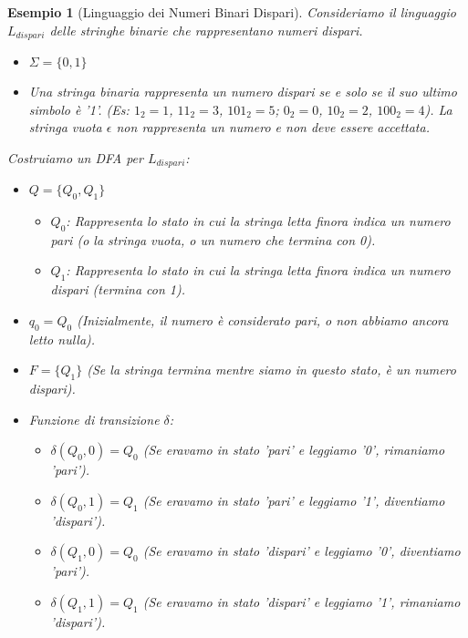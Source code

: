 \documentclass[a4paper]{article}
\newtheorem{example}{Esempio}
\begin{document}
\begin{example}[Linguaggio dei Numeri Binari Dispari]
Consideriamo il linguaggio $L_{dispari}$ delle stringhe binarie che rappresentano numeri dispari.
\begin{itemize}
    \item $\Sigma = \{0, 1\}$
    \item Una stringa binaria rappresenta un numero dispari se e solo se il suo ultimo simbolo è '1'. (Es: $1_2=1$, $11_2=3$, $101_2=5$; $0_2=0$, $10_2=2$, $100_2=4$). La stringa vuota $\epsilon$ non rappresenta un numero e non deve essere accettata.
\end{itemize}

Costruiamo un DFA per $L_{dispari}$:
\begin{itemize}
    \item $Q = \{Q_0, Q_1\}$
        \begin{itemize}
            \item $Q_0$: Rappresenta lo stato in cui la stringa letta finora indica un numero pari (o la stringa vuota, o un numero che termina con 0).
            \item $Q_1$: Rappresenta lo stato in cui la stringa letta finora indica un numero dispari (termina con 1).
        \end{itemize}
    \item $q_0 = Q_0$ (Inizialmente, il numero è considerato pari, o non abbiamo ancora letto nulla).
    \item $F = \{Q_1\}$ (Se la stringa termina mentre siamo in questo stato, è un numero dispari).
    \item Funzione di transizione $\delta$:
        \begin{itemize}
            \item $\delta(Q_0, 0) = Q_0$ (Se eravamo in stato 'pari' e leggiamo '0', rimaniamo 'pari').
            \item $\delta(Q_0, 1) = Q_1$ (Se eravamo in stato 'pari' e leggiamo '1', diventiamo 'dispari').
            \item $\delta(Q_1, 0) = Q_0$ (Se eravamo in stato 'dispari' e leggiamo '0', diventiamo 'pari').
            \item $\delta(Q_1, 1) = Q_1$ (Se eravamo in stato 'dispari' e leggiamo '1', rimaniamo 'dispari').
        \end{itemize}
\end{itemize}

\begin{figure}[h!]
    \centering
\end{figure}
\end{example}
\end{document}
